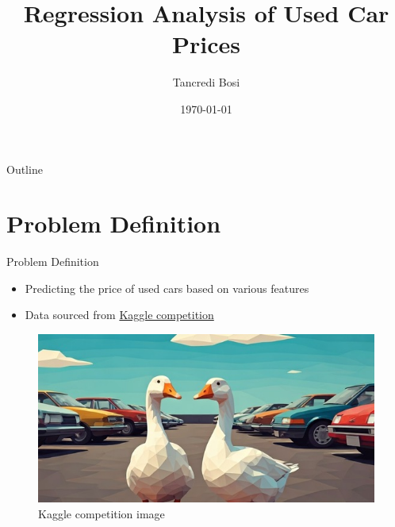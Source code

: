 \documentclass{beamer}
\title{\textbf{Regression Analysis of Used Car Prices}}
\author{Tancredi Bosi}
\institute{Alma Mater Studiorum Bologna}
\date{\today}
\begin{document}
\begin{frame}
    \titlepage
\end{frame}

\begin{frame}{Outline}
    \tableofcontents
\end{frame}

\section{Problem Definition}
\begin{frame}{Problem Definition}
    \begin{itemize}
        \item Predicting the price of used cars based on various features
        \item Data sourced from \href{https://www.kaggle.com/competitions/playground-series-s4e9}{Kaggle competition}
    \end{itemize}
    \begin{figure}
        \centering
        \includegraphics[width=0.6\linewidth]{images/kaggle_car_price_main_image.png}
        \caption{Kaggle competition image}
    \end{figure}
\end{frame}

\end{document}
